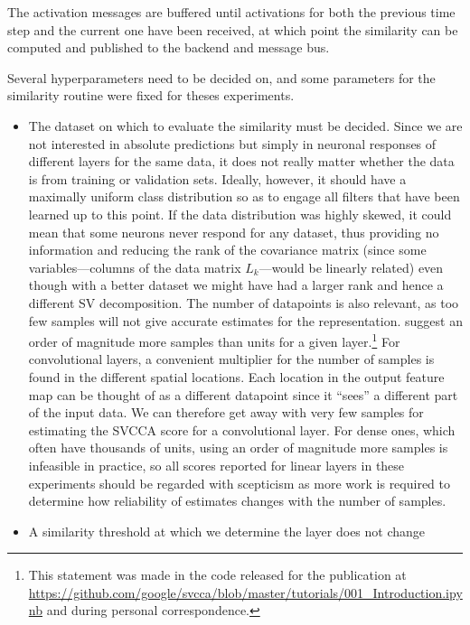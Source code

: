 The activation messages are buffered until activations for both the previous
time step and the current one have been received, at which point the similarity
can be computed and published to the backend and message bus.

Several hyperparameters need to be decided on, and some parameters for the
similarity routine were fixed for theses experiments.
\begin{itemize}
    \item The dataset on
        which to evaluate the similarity must be decided. Since we are not interested in
        absolute predictions but simply in neuronal responses of different layers for
        the same data, it does not really matter whether the data is from training or
        validation sets. Ideally, however, it should have a maximally uniform class
        distribution so as to engage all filters that have been learned up to this
        point. If the data distribution was highly skewed, it could mean that some
        neurons never respond for any dataset, thus providing no information and
        reducing the rank of the covariance matrix (since some variables---columns of
        the data matrix $L_k$---would be linearly related) even though with a better
        dataset we might have had a larger rank and hence a different SV
        decomposition. The number of datapoints is also relevant, as too few
        samples will not give accurate estimates for the representation.
        \citeauthor{raghu2017svcca} suggest an order of magnitude more samples
        than units for a given layer.\footnote{This statement was made in
        the code released for the publication at
        \url{https://github.com/google/svcca/blob/master/tutorials/001_Introduction.ipynb}
        and during personal correspondence.} For convolutional layers, a
        convenient multiplier for the number of samples is found in the
        different spatial locations. Each location in the output feature map can
        be thought of as a different datapoint since it ``sees'' a different part of
        the input data. We can therefore get away with very few samples for
        estimating the SVCCA score for a convolutional layer. For dense ones,
        which often have thousands of units, using an order of magnitude more
        samples is infeasible in practice, so all scores reported for linear
        layers in these experiments should be regarded with scepticism as more
        work is required to determine how reliability of estimates changes with
        the number of samples.
    \item A similarity threshold at which we determine the layer does not change

\end{itemize}
